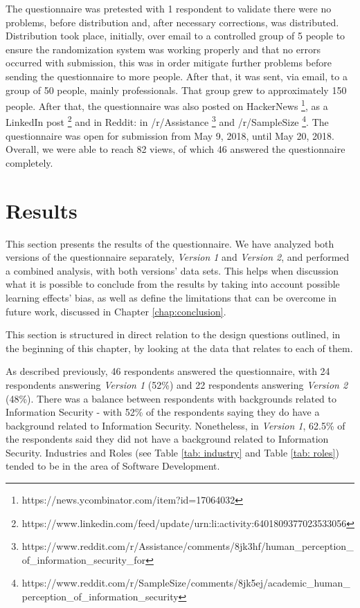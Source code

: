The questionnaire was pretested with 1 respondent to validate there were no problems, before distribution and, after necessary corrections, was distributed. Distribution took place, initially, over email to a controlled group of 5 people to ensure the randomization system was working properly and that no errors occurred with submission, this was in order mitigate further problems before sending the questionnaire to more people. After that, it was sent, via email, to a group of 50 people, mainly professionals. That group grew to approximately 150 people. After that, the questionnaire was also posted on HackerNews \footnote{https://news.ycombinator.com/item?id=17064032}, as a LinkedIn post \footnote{https://www.linkedin.com/feed/update/urn:li:activity:6401809377023533056} and in Reddit: in /r/Assistance \footnote{https://www.reddit.com/r/Assistance/comments/8jk3hf/human\_perception\_of\_information\_security\_for} and /r/SampleSize  \footnote{https://www.reddit.com/r/SampleSize/comments/8jk5ej/academic\_human\_perception\_of\_information\_security}. The questionnaire was open for submission from May 9, 2018, until May 20, 2018. Overall, we were able to reach 82 views, of which 46 answered the questionnaire completely.

\section{Results}


This section presents the results of the questionnaire. We have analyzed both versions of the questionnaire separately, \textit{Version 1} and \textit{Version 2}, and performed a combined analysis, with both versions' data sets. This helps when discussion what it is possible to conclude from the results by taking into account possible learning effects' bias, as well as define the limitations that can be overcome in future work, discussed in Chapter \ref{chap:conclusion}.

This section is structured in direct relation to the design questions outlined, in the beginning of this chapter, by looking at the data that relates to each of them.

As described previously, 46 respondents answered the questionnaire, with 24 respondents answering \textit{Version 1} (52\%) and 22 respondents answering \textit{Version 2} (48\%). There was a balance between respondents with backgrounds related to Information Security - with 52\% of the respondents saying they do have a background related to Information Security. Nonetheless, in \textit{Version 1}, 62.5\% of the respondents said they did not have a background related to Information Security. Industries and Roles (see Table \ref{tab: industry} and Table \ref{tab: roles}) tended to be in the area of Software Development.

